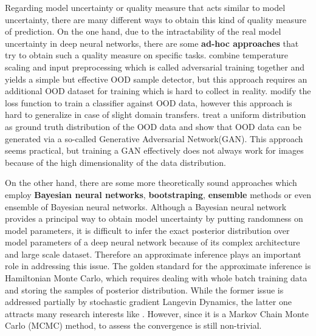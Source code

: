 Regarding model uncertainty or quality measure that acts similar to model uncertainty, there are many different ways to obtain this kind of quality measure of prediction. On the one hand, due to the intractability of the real model uncertainty in deep neural networks, there are some \textbf{ad-hoc approaches} that try to obtain such a quality measure on specific tasks.
\cite{liang2017enhancing} combine temperature scaling and input preprocessing which is called adversarial training together and yields a simple but effective OOD sample detector, but this approach requires an additional OOD dataset for training which is hard to collect in reality. \cite{devries2018learning} modify the loss function to train a classifier against OOD data, however this approach is hard to generalize in case of slight domain transfers. \cite{lee2017training} treat a uniform distribution as ground truth distribution of the OOD data and show that OOD data can be generated via a so-called Generative Adversarial Network(GAN). This approach seems practical, but training a GAN effectively does not always work for images because of the high dimensionality of the data distribution. 

On the other hand, there are some more theoretically sound approaches which employ \textbf{Bayesian neural networks}\cite{mackay1992practical}\cite{neal2012bayesian}, \textbf{bootstraping}\cite{osband2016deep}, \textbf{ensemble} methods\cite{lakshminarayanan2017simple} or even ensemble of Bayesian neural networks\cite{smith2018understanding}. Although a Bayesian neural network provides a principal way to obtain model uncertainty by putting randomness on model parameters, it is difficult to infer the exact posterior distribution over model parameters of a deep neural network because of its complex architecture and large scale dataset. Therefore an approximate inference plays an important role in addressing this issue. The golden standard for the approximate inference is Hamiltonian Monte Carlo\cite{neal2012bayesian}, which requires dealing with whole batch training data and storing the samples of posterior distribution. While the former issue is addressed partially by stochastic gradient Langevin Dynamics\cite{welling2011bayesian}, the latter one attracts many research interests like \cite{balan2015bayesian}\cite{wang2018adversarial}. However, since it is a Markov Chain Monte Carlo (MCMC) method, to assess the convergence is still non-trivial.

